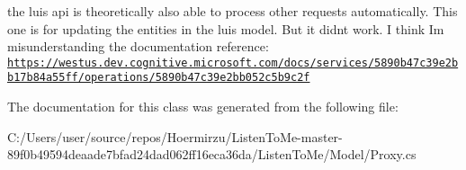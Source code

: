 the luis api is theoretically also able to process other requests automatically. This one is for updating the entities in the luis model. But it didn\textquotesingle{}t work. I think I\textquotesingle{}m misunderstanding the documentation reference\+: \href{https://westus.dev.cognitive.microsoft.com/docs/services/5890b47c39e2bb17b84a55ff/operations/5890b47c39e2bb052c5b9c2f}{\tt https\+://westus.\+dev.\+cognitive.\+microsoft.\+com/docs/services/5890b47c39e2bb17b84a55ff/operations/5890b47c39e2bb052c5b9c2f} 



The documentation for this class was generated from the following file\+:\begin{DoxyCompactItemize}
\item 
C\+:/\+Users/user/source/repos/\+Hoermirzu/\+Listen\+To\+Me-\/master-\/89f0b49594deaade7bfad24dad062ff16eca36da/\+Listen\+To\+Me/\+Model/Proxy.\+cs\end{DoxyCompactItemize}
